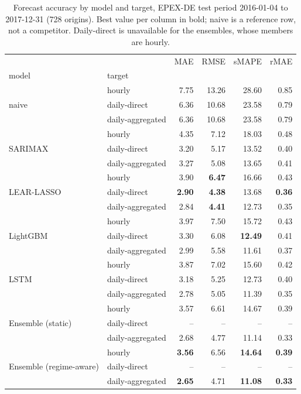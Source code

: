 \begin{table}[htbp]
\caption{Forecast accuracy by model and target, EPEX-DE test period 2016-01-04 to 2017-12-31 (728 origins). Best value per column in bold; naive is a reference row, not a competitor. Daily-direct is unavailable for the ensembles, whose members are hourly.}
\label{tab:results-canonical}
\begin{tabular}{llrrrr}
\toprule
 &  & MAE & RMSE & sMAPE & rMAE \\
model & target &  &  &  &  \\
\midrule
\multirow[t]{3}{*}{naive} & hourly & 7.75 & 13.26 & 28.60 & 0.85 \\
 & daily-direct & 6.36 & 10.68 & 23.58 & 0.79 \\
 & daily-aggregated & 6.36 & 10.68 & 23.58 & 0.79 \\
\cline{1-6}
\multirow[t]{3}{*}{SARIMAX} & hourly & 4.35 & 7.12 & 18.03 & 0.48 \\
 & daily-direct & 3.20 & 5.17 & 13.52 & 0.40 \\
 & daily-aggregated & 3.27 & 5.08 & 13.65 & 0.41 \\
\cline{1-6}
\multirow[t]{3}{*}{LEAR-LASSO} & hourly & 3.90 & \textbf{6.47} & 16.66 & 0.43 \\
 & daily-direct & \textbf{2.90} & \textbf{4.38} & 13.68 & \textbf{0.36} \\
 & daily-aggregated & 2.84 & \textbf{4.41} & 12.73 & 0.35 \\
\cline{1-6}
\multirow[t]{3}{*}{LightGBM} & hourly & 3.97 & 7.50 & 15.72 & 0.43 \\
 & daily-direct & 3.30 & 6.08 & \textbf{12.49} & 0.41 \\
 & daily-aggregated & 2.99 & 5.58 & 11.61 & 0.37 \\
\cline{1-6}
\multirow[t]{3}{*}{LSTM} & hourly & 3.87 & 7.02 & 15.60 & 0.42 \\
 & daily-direct & 3.18 & 5.25 & 12.73 & 0.40 \\
 & daily-aggregated & 2.78 & 5.05 & 11.39 & 0.35 \\
\cline{1-6}
\multirow[t]{3}{*}{Ensemble (static)} & hourly & 3.57 & 6.61 & 14.67 & 0.39 \\
 & daily-direct & -- & -- & -- & -- \\
 & daily-aggregated & 2.68 & 4.77 & 11.14 & 0.33 \\
\cline{1-6}
\multirow[t]{3}{*}{Ensemble (regime-aware)} & hourly & \textbf{3.56} & 6.56 & \textbf{14.64} & \textbf{0.39} \\
 & daily-direct & -- & -- & -- & -- \\
 & daily-aggregated & \textbf{2.65} & 4.71 & \textbf{11.08} & \textbf{0.33} \\
\cline{1-6}
\bottomrule
\end{tabular}
\end{table}
